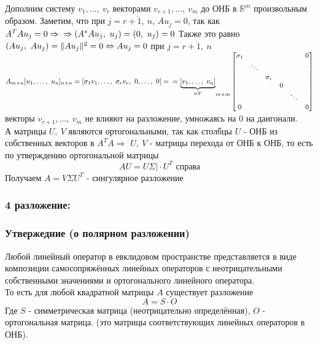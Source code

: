 \documentclass[12pt, letterpaper, twoside]{article}
\newcommand{\mb}[1]{\mathbb{#1}}
\begin{document}
    Дополним систему $v_1,\dots,\ v_r$ векторами $v_{r + 1},\dots,\ v_{m}$ до ОНБ в $\mb{R}^m$ произвольным образом. Заметим, что при $j = \overline{r + 1,\ n}$, $Au_j = 0$, так как $A^T A u_j = 0\Rightarrow\\
    \Rightarrow (A^* A u_j,\ u_j) = (0,\ u_j) = 0$ Также это равно $(A u_j,\ A u_j) = \Vert A u_j \Vert^2 = 0\\
    \Leftrightarrow A u_j = 0$ при $j = \overline{r + 1,\ n}$\\
    $A_{m\times n}[u_1,\dots,\ u_n]_{n\times n} = [\sigma_1 v_1,\dots,\ \sigma_r v_r,\ 0,\dots,\ 0] =\\
    = \underset{=V}{\underbrace{[v_1,\dots,\ v_n]}}_{m\times m} \left[ \begin{matrix}
        \sigma_1 &        &          &   &        & 0\\
                 & \ddots &          &   &        &\\
                 &        &\sigma_r  &   &        &\\
                 &        &          & 0 &        &\\
                 &        &          &   & \ddots &\\
        0         &        &          &   &        & 0
    \end{matrix}\right]$\\
    векторы $v_{r + 1},\dots,\ v_m$ не влияют на разложение, умножаясь на $0$ на даигонали.\\
    А матрицы $U,\ V$ являются ортогональными, так как столбцы $U$ - ОНБ из собственных векторов в $A^T A\Rightarrow$ $U,\ V$ - матрицы перехода от ОНБ к ОНБ, то есть по утверждению ортогональной матрицы
    \[AU = U\Sigma \big| \cdot U^T\text{ справа}\]
    Получаем $A = V\Sigma U^T$ - сингулярное разложение
    
    \subsubsection*{4 разложение:}
    \subsubsection*{Утвержедние (о полярном разложении)}
    Любой линейный оператор в евклидовом пространстве представляется в виде композиции самосопряжённых линейных операторов с неотрицательными собственными значениями и ортогонального линейного оператора.\\
    То есть для любой квадратной матрицы $A$ существует разложение
    \[A = S\cdot O\]
    Где $S$ - симметрическая матрица (неотрицательно определённая), $O$ - ортогональная матрица. (это матрицы соответствующих линейных операторов в ОНБ).
\end{document}
